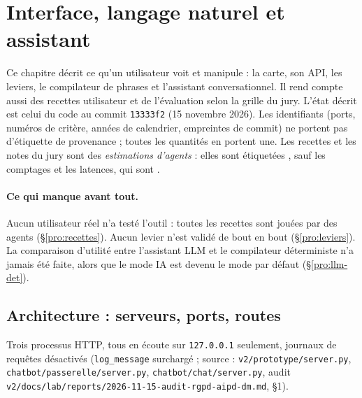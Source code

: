 \begingroup\sloppy
\section{Interface, langage naturel et assistant}\label{sec:produit-ref}\label{pro:sec}

Ce chapitre décrit ce qu'un utilisateur voit et manipule : la carte, son API, les leviers, le compilateur de phrases et l'assistant conversationnel.
Il rend compte aussi des recettes utilisateur et de l'évaluation selon la grille du jury.
L'état décrit est celui du code au commit \texttt{13333f2} (15 novembre 2026).
Les identifiants (ports, numéros de critère, années de calendrier, empreintes de commit) ne portent pas d'étiquette de provenance ; toutes les quantités en portent une.
Les recettes et les notes du jury sont des \emph{estimations d'agents} : elles sont étiquetées \suppose{}, sauf les comptages et les latences, qui sont \mesure{}.

\paragraph{Ce qui manque avant tout.}
Aucun utilisateur réel n'a testé l'outil : toutes les recettes sont jouées par des agents (§\ref{pro:recettes}).
Aucun levier n'est validé de bout en bout (§\ref{pro:leviers}).
La comparaison d'utilité entre l'assistant LLM et le compilateur déterministe n'a jamais été faite, alors que le mode IA est devenu le mode par défaut (§\ref{pro:llm-det}).

\subsection{Architecture : serveurs, ports, routes}\label{pro:archi}

Trois processus HTTP, tous en écoute sur \texttt{127.0.0.1} seulement, journaux de requêtes désactivés
(\texttt{log\_\allowbreak{}message} surchargé ; source : \texttt{v2/\allowbreak{}prototype/\allowbreak{}server.py}, \texttt{chatbot/\allowbreak{}passerelle/\allowbreak{}server.py}, \texttt{chatbot/\allowbreak{}chat/\allowbreak{}server.py}, audit \texttt{v2/\allowbreak{}docs/\allowbreak{}lab/\allowbreak{}reports/\allowbreak{}2026-\allowbreak{}11-\allowbreak{}15-\allowbreak{}audit-\allowbreak{}rgpd-\allowbreak{}aipd-\allowbreak{}dm.md}, §1).

